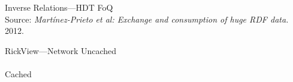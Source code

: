 \documentclass[14pt,aspectratio=169]{beamer}
\begin{document}
\begin{frame}[plain]{Inverse Relations---HDT FoQ}
\centering
{}\\
\footnotesize Source: \emph{Martínez-Prieto et al: Exchange and consumption of huge RDF data.} 2012.
\end{frame}

\begin{frame}[plain]{RickView---Network}
\centering
Uncached\\
\\
\pause
Cached\\
\centering{}
\end{frame}
\end{document}
